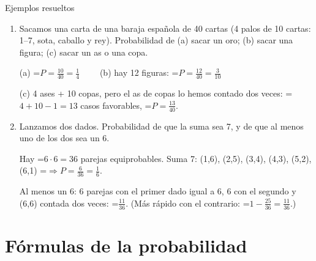 \documentclass[11pt,a4paper]{article}
\newcommand{\fmm}[1]{\setbox0=\hbox{$#1$}\ifdim\wd0>\linewidth\[#1\]\else\mbox{\box0}\fi}
\begin{document}
  
\begin{fmex}{Ejemplos resueltos}
\begin{enumerate}[label=\textbf{\arabic*.},leftmargin=*]
\item Sacamos una carta de una baraja española de 40 cartas (4 palos de 10 cartas: 1--7, sota, caballo y rey). Probabilidad de (a) sacar un oro; (b) sacar una figura; (c) sacar un as o una copa.
          

            

(a) \fmm{P=\frac{10}{40}=\frac14\qquad} (b) hay 12 figuras: \fmm{P=\frac{12}{40}=\frac{3}{10}}

            

(c) 4 ases + 10 copas, pero el as de copas lo hemos contado dos veces: \fmm{4+10-1=13} casos favorables, \fmm{P=\frac{13}{40}}.
\item Lanzamos dos dados. Probabilidad de que la suma sea 7, y de que al menos uno de los dos sea un 6.
          

            

Hay \fmm{6\cdot6=36} parejas equiprobables. Suma 7: (1,6), (2,5), (3,4), (4,3), (5,2), (6,1) \fmm{\Rightarrow P=\frac{6}{36}=\frac16}.

            

Al menos un 6: 6 parejas con el primer dado igual a 6, 6 con el segundo y (6,6) contada dos veces: \fmm{\frac{11}{36}}. (Más rápido con el contrario: \fmm{1-\frac{25}{36}=\frac{11}{36}}.)
\end{enumerate}
\end{fmex}

  
\section{Fórmulas de la probabilidad}\hypertarget{sec5}{}

  
\end{document}
